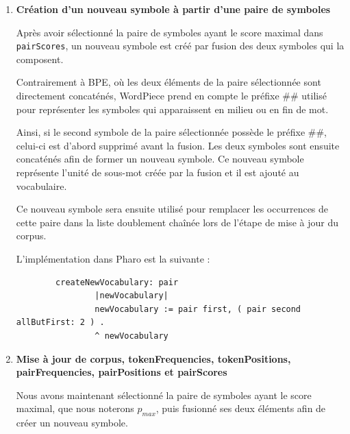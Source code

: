 \documentclass[12pt,a4paper]{report}
\begin{document}
\begin{enumerate}
	La méthode \texttt{findPairToMerge} réalise cette opération en parcourant les associations contenues dans \texttt{pairScores} et en sélectionnant celle dont la valeur associée, correspondant au score de la paire, est maximale. Elle retourne ensuite la paire de symboles correspondante.
	
	L'implémentation de cette méthode dans Pharo est la suivante :
	
	\begin{verbatim}
		findPairToMerge
				^ (pairScores associations detectMax: [:assoc | assoc value]) key
	\end{verbatim}
	
	\item \textbf{Création d’un nouveau symbole à partir d’une paire de symboles}
	
	Après avoir sélectionné la paire de symboles ayant le score maximal dans \texttt{pairScores}, un nouveau symbole est créé par fusion des deux symboles qui la composent.
	
	Contrairement à BPE, où les deux éléments de la paire sélectionnée sont directement concaténés, WordPiece prend en compte le préfixe \#\# utilisé pour représenter les symboles qui apparaissent en milieu ou en fin de mot.
	
	Ainsi, si le second symbole de la paire sélectionnée possède le préfixe \#\#, celui-ci est d'abord supprimé avant la fusion. Les deux symboles sont ensuite concaténés afin de former un nouveau symbole. Ce nouveau symbole représente l'unité de sous-mot créée par la fusion et il est ajouté au vocabulaire.
	
	Ce nouveau symbole sera ensuite utilisé pour remplacer les occurrences de cette paire dans la liste doublement chaînée lors de l'étape de mise à jour du corpus.
	
	L'implémentation dans Pharo est la suivante :
	
	\begin{verbatim}
		createNewVocabulary: pair
				|newVocabulary|
				newVocabulary := pair first, ( pair second allButFirst: 2 ) .
				^ newVocabulary 
	\end{verbatim}
	
	\item \textbf{Mise à jour de corpus, tokenFrequencies, tokenPositions, pairFrequencies, pairPositions et pairScores}
	
	Nous avons maintenant sélectionné la paire de symboles ayant le score maximal, que nous noterons $p_{max}$, puis fusionné ses deux éléments afin de créer un nouveau symbole.
	

\end{enumerate}
\end{document}

